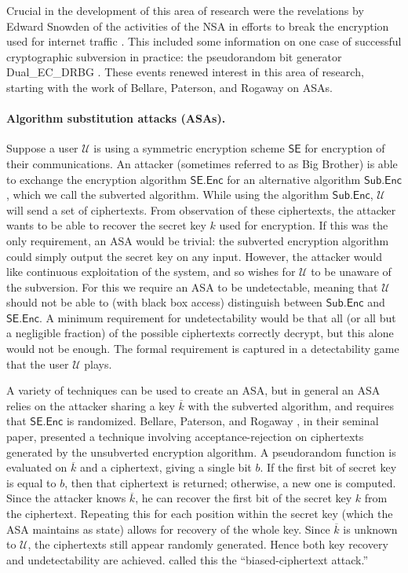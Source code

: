 Crucial in the development of this area of research were the revelations by Edward Snowden of the activities of the NSA in efforts to break the encryption used for internet traffic \cite{snowden}. This included some information on one case of successful cryptographic subversion in practice: the pseudorandom bit generator Dual\_EC\_DRBG \cite{USENIX:CNEGLRBMSF14}. These events renewed interest in this area of research, starting with the work of Bellare, Paterson, and Rogaway \cite{C:BelPatRog14} on ASAs.

\paragraph{Algorithm substitution attacks (ASAs).} Suppose a user $\mathcal{U}$ is using a symmetric encryption scheme $\mathsf{SE}$ for encryption of their communications. An attacker (sometimes referred to as Big Brother) is able to exchange the encryption algorithm $\mathsf{SE.Enc}$ for an alternative algorithm $\mathsf{Sub.Enc}$, which we call the subverted algorithm. While using the algorithm $\mathsf{Sub.Enc}$, $\mathcal{U}$ will send a set of ciphertexts. From observation of these ciphertexts, the attacker wants to be able to recover the secret key $k$ used for encryption. If this was the only requirement, an ASA would be trivial: the subverted encryption algorithm could simply output the secret key on any input. However, the attacker would like continuous exploitation of the system, and so wishes for $\mathcal{U}$ to be unaware of the subversion. For this we require an ASA to be undetectable, meaning that $\mathcal{U}$ should not be able to (with black box access) distinguish between  $\mathsf{Sub.Enc}$ and $\mathsf{SE.Enc}$. A minimum requirement for undetectability would be that all (or all but a negligible fraction) of the possible ciphertexts correctly decrypt, but this alone would not be enough. The formal requirement is captured in a detectability game that the user $\mathcal{U}$ plays.

A variety of techniques can be used to create an ASA, but in general an ASA relies on the attacker sharing a key $\overline{k}$ with the subverted algorithm, and requires that $\mathsf{SE.Enc}$ is randomized. Bellare, Paterson, and Rogaway \cite{C:BelPatRog14}, in their seminal paper, presented a technique involving acceptance-rejection on ciphertexts generated by the unsubverted encryption algorithm. A pseudorandom function is evaluated on $\overline{k}$ and a ciphertext, giving a single bit $b$. If the first bit of secret key is equal to $b$, then that ciphertext is returned; otherwise, a new one is computed. Since the attacker knows $\overline{k}$, he can recover the first bit of the secret key $k$ from the ciphertext. Repeating this for each position within the secret key (which the ASA maintains as state) allows for recovery of the whole key. Since $\overline{k}$ is unknown to $\mathcal{U}$, the ciphertexts still appear randomly generated. Hence both key recovery and undetectability are achieved. \cite{C:BelPatRog14} called this the ``biased-ciphertext attack.''

